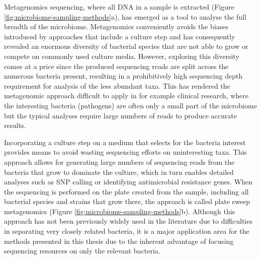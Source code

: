 \documentclass[officiallayout]{tktla}
\begin{document}
Metagenomics sequencing, where all DNA in a sample is extracted
(Figure \ref{fig:microbiome-sampling-methods}a), has emerged as a tool
to analyse the full breadth of the microbiome. Metagenomics
conveniently avoids the biases introduced by approaches that include a
culture step and has consequently revealed an enormous diversity of
bacterial species that are not able to grow or compete on commonly
used culture media. However, exploring this diversity comes at a price
since the produced sequencing reads are split across the numerous
bacteria present, resulting in a prohibitively high sequencing depth
requirement for analysis of the less abundant taxa. This has rendered
the metagenomic approach difficult to apply in for example clinical
research, where the interesting bacteria (pathogens) are often only a
small part of the microbiome but the typical analyses require large
numbers of reads to produce accurate results.

Incorporating a culture step on a medium that selects for the bacteria
interest provides means to avoid wasting sequencing efforts on
uninteresting taxa. This approach allows for generating large numbers
of sequencing reads from the bacteria that grow to dominate the
culture, which in turn enables detailed analyses such as SNP calling
or identifying antimicrobial resistance genes. When the sequencing is
performed on the plate created from the sample, including all
bacterial species and strains that grow there, the approach is called
plate sweep metagenomics (Figure
\ref{fig:microbiome-sampling-methods}b). Although this approach has
not been previously widely used in the literature due to difficulties
in separating very closely related bacteria, it is a major application
area for the methods presented in this thesis due to the inherent
advantage of focusing sequencing resources on only the relevant
bacteria.
\end{document}
